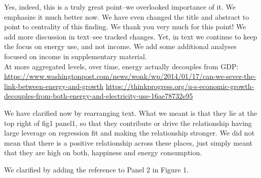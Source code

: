 Yes, indeed, this is a truly great point--we overlooked importance of it. We emphasize it much
better now. We have even changed the title and abstract to point to centrality of
this finding. We thank you very much for this point! We add more discussion in
text--see tracked changes.
Yet, in text we continue to keep the focus on energy use, and not income. We add
 some additional analyses focused on income in supplementary material.
\\

At more aggregated levels, over time, energy  actually decouples from GDP:
\url{https://www.washingtonpost.com/news/wonk/wp/2014/01/17/can-we-sever-the-link-between-energy-and-growth}
\url{https://thinkprogress.org/u-s-economic-growth-decouples-from-both-energy-and-electricity-use-16ae78732e95}



We have clarified now by rearranging text. What we meant is that they lie at the top right of fig1
panel1, so that they contribute or drive the relationship having large leverage
on regression fit and making the relationship stronger. We did not mean that
there is a positive relationship across these places, just simply meant that
they are high on both, happiness and energy consumption.


We clarified by adding the reference to Panel 2 in Figure 1.



